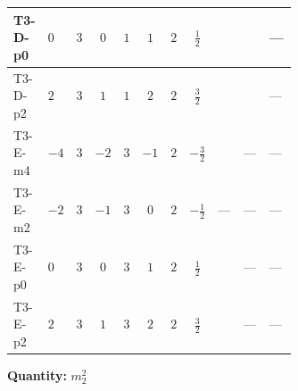 \documentclass[8pt]{article}
\begin{document}
\begin{landscape}
\begin{longtable}{@{}llcccccc >{\raggedright\arraybackslash}p{0.21\linewidth} >{\raggedright\arraybackslash}p{0.21\linewidth} >{\raggedright\arraybackslash}p{0.21\linewidth}@{}}
\midrule
T3-D-p0 & $0$ & $3$ & $0$ & $1$ & $1$ & $2$ & $\frac{1}{2}$ & \scriptsize\adjustbox{max width=\linewidth}{$\begin{gathered} -6 {g_1}^2 {m_2^2}\end{gathered}$} & \scriptsize\adjustbox{max width=\linewidth}{$\begin{gathered} +6 {\lambda_{12}^{(1)}} {m_1^2}\end{gathered}$} & --- \\
\midrule
T3-D-p2 & $2$ & $3$ & $1$ & $1$ & $2$ & $2$ & $\frac{3}{2}$ & \scriptsize\adjustbox{max width=\linewidth}{$\begin{gathered} -24 {g_1}^2 {m_2^2}\end{gathered}$} & \scriptsize\adjustbox{max width=\linewidth}{$\begin{gathered} +6 {\lambda_{12}^{(1)}} {m_1^2}\end{gathered}$} & --- \\
\midrule
T3-E-m4 & $-4$ & $3$ & $-2$ & $3$ & $-1$ & $2$ & $-\frac{3}{2}$ & \scriptsize\adjustbox{max width=\linewidth}{$\begin{gathered} -6 {g_1}^2 {m_2^2}\end{gathered}$} & --- & --- \\
\midrule
T3-E-m2 & $-2$ & $3$ & $-1$ & $3$ & $0$ & $2$ & $-\frac{1}{2}$ & --- & --- & --- \\
\midrule
T3-E-p0 & $0$ & $3$ & $0$ & $3$ & $1$ & $2$ & $\frac{1}{2}$ & \scriptsize\adjustbox{max width=\linewidth}{$\begin{gathered} -6 {g_1}^2 {m_2^2}\end{gathered}$} & --- & --- \\
\midrule
T3-E-p2 & $2$ & $3$ & $1$ & $3$ & $2$ & $2$ & $\frac{3}{2}$ & \scriptsize\adjustbox{max width=\linewidth}{$\begin{gathered} -24 {g_1}^2 {m_2^2}\end{gathered}$} & --- & --- \\
\midrule
\bottomrule
\end{longtable}
\clearpage
\noindent\textbf{Quantity: }$m_2^2$\par\smallskip

\end{landscape}
\end{document}
